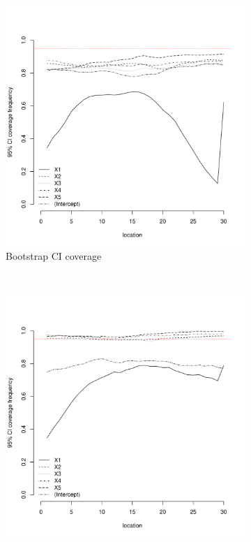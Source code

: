 \documentclass[authoryear, review, 11pt]{elsarticle}
\begin{document}
\begin{figure}
	\vspace{-30mm}
	\centering
	\begin{subfigure}[b]{0.45\textwidth}
	\centering
		\includegraphics[width=\textwidth]{../../figures/simulation/15.26.profile_bootstrap_coverage.pdf}
		\caption{Bootstrap CI coverage}
	\end{subfigure}%
	~ %
	\begin{subfigure}[b]{0.45\textwidth}
	\centering
		\includegraphics[width=\textwidth]{../../figures/simulation/15.26.profile_se_coverage.pdf}

\end{subfigure}
\end{figure}
\end{document}
